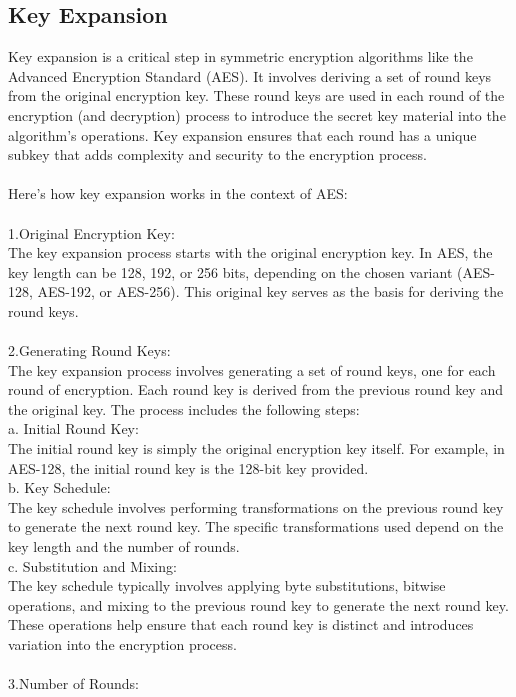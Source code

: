 \documentclass{report}
\begin{document}
\subsection{Key Expansion}
Key expansion is a critical step in symmetric encryption algorithms like the Advanced Encryption Standard (AES). It involves deriving a set of round keys from the original encryption key. These round keys are used in each round of the encryption (and decryption) process to introduce the secret key material into the algorithm's operations. Key expansion ensures that each round has a unique subkey that adds complexity and security to the encryption process.\\
\\
Here's how key expansion works in the context of AES:\\
\\
1.Original Encryption Key:\\
The key expansion process starts with the original encryption key. In AES, the key length can be 128, 192, or 256 bits, depending on the chosen variant (AES-128, AES-192, or AES-256). This original key serves as the basis for deriving the round keys.\\
\\
2.Generating Round Keys:\\
The key expansion process involves generating a set of round keys, one for each round of encryption. Each round key is derived from the previous round key and the original key. The process includes the following steps:\\
a. Initial Round Key:\\
The initial round key is simply the original encryption key itself. For example, in AES-128, the initial round key is the 128-bit key provided.\\
b. Key Schedule:\\
The key schedule involves performing transformations on the previous round key to generate the next round key. The specific transformations used depend on the key length and the number of rounds.\\
c. Substitution and Mixing:\\
The key schedule typically involves applying byte substitutions, bitwise operations, and mixing to the previous round key to generate the next round key. These operations help ensure that each round key is distinct and introduces variation into the encryption process.\\
\\
3.Number of Rounds:\\
\end{document}
